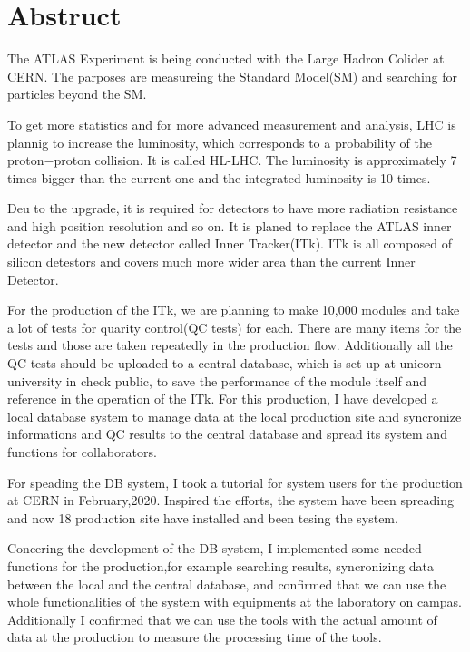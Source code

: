\chapter*{Abstruct}

The ATLAS Experiment is being conducted with the Large Hadron Colider at CERN. The parposes are measureing the Standard Model(SM) and searching for particles beyond the SM.

To get more statistics and for more advanced measurement and analysis, LHC is plannig to increase the luminosity, which corresponds to a probability of the proton$-$proton collision. It is called HL-LHC.
The luminosity is approximately 7 times bigger than the current one and the integrated luminosity is 10 times.

Deu to the upgrade, it is required for detectors to have more radiation resistance and high position resolution and so on. 
It is planed to replace the ATLAS inner detector and the new detector called Inner Tracker(ITk). 
ITk is all composed of silicon detestors and covers much more wider area than the current Inner Detector.

For the production of the ITk, we are planning to make 10,000 modules and take a lot of tests for quarity control(QC tests) for each. 
There are many items for the tests and those are taken repeatedly in the production flow.
Additionally all the QC tests should be uploaded to a central database, which is set up at unicorn university in check public, to save the performance of the module itself and reference in the operation of the ITk. 
For this production, I have developed a local database system to manage data at the local production site and syncronize informations and QC results to the central database and spread its system and functions for collaborators.

For speading the DB system, I took a tutorial for system users for the production at CERN in February,2020. Inspired the efforts, the system have been spreading and now 18 production site have installed and been tesing the system.

Concering the development of the DB system, I implemented some needed functions for the production,for example searching results, syncronizing data between the local and the central database, and confirmed that we can use the whole functionalities of the system with equipments at the laboratory on campas. 
Additionally I confirmed that we can use the tools with the actual amount of data at the production to measure the processing time of the tools.

